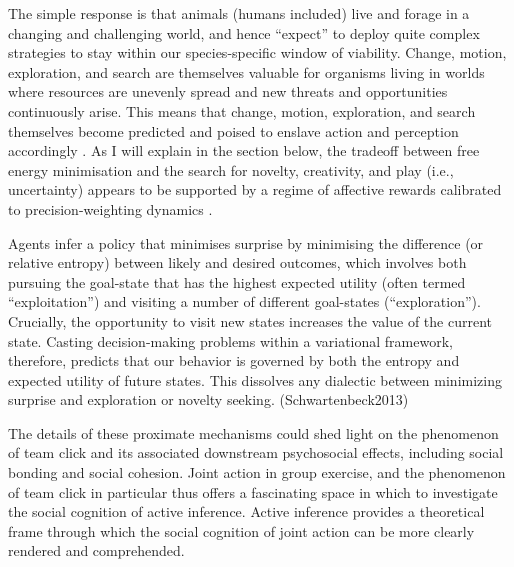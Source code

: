 \begin{CJK}{UTF8}{gbsn}
The simple response is that animals (humans included) live and forage in a changing and challenging world, and hence ``expect'' to deploy quite complex strategies to stay within our species-specific window of viability.  Change, motion, exploration, and search are themselves valuable for organisms living in worlds where resources are unevenly spread and new threats and opportunities continuously arise. This means that change, motion, exploration, and search themselves become predicted and poised to enslave action and perception accordingly \citep[193]{Clark2013}.  As I will explain in the section below, the tradeoff between free energy minimisation and the search for novelty, creativity, and play (i.e., uncertainty) appears to be supported by a regime of affective rewards calibrated to precision-weighting dynamics \citep{Chetverikov2016}.

Agents infer a policy that minimises surprise by minimising the difference (or relative entropy) between likely and desired outcomes, which involves both pursuing the goal-state that has the highest expected utility (often termed “exploitation”) and visiting a number of different goal-states (“exploration”). Crucially, the opportunity to visit new states increases the value of the current state. Casting decision-making problems within a variational framework, therefore, predicts that our behavior is governed by both the entropy and expected utility of future states. This dissolves any dialectic between minimizing surprise and exploration or novelty seeking.
(Schwartenbeck2013)



The details of these proximate mechanisms could shed light on the phenomenon of team click and its associated downstream psychosocial effects, including social bonding and social cohesion.  Joint action in group exercise, and the phenomenon of team click in particular thus offers a fascinating space in which to investigate the social cognition of active inference.  Active inference provides a theoretical frame through which the social cognition of joint action can be more clearly rendered and comprehended.





























\end{CJK}
